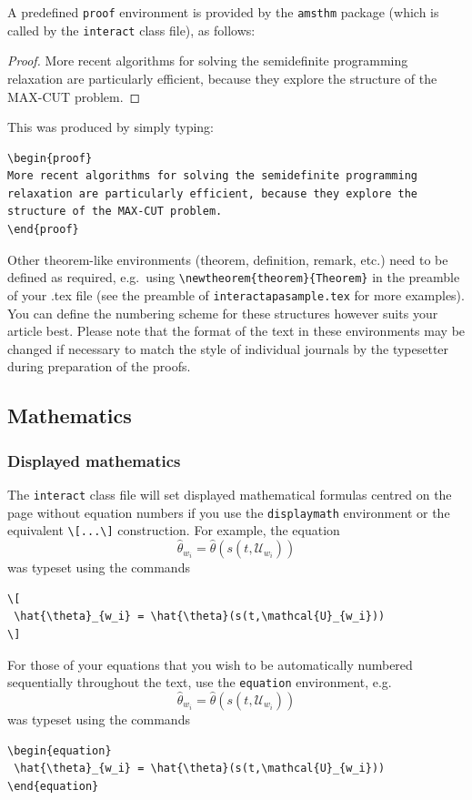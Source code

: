 \documentclass[]{interact}
\theoremstyle{plain}%
\theoremstyle{definition}
\theoremstyle{remark}
\begin{document}
A predefined \verb"proof" environment is provided by the \texttt{amsthm} package (which is called by the \texttt{interact} class file), as follows:
\begin{proof}
More recent algorithms for solving the semidefinite programming relaxation are particularly efficient, because they explore the structure of the MAX-CUT problem.
\end{proof}
\noindent This was produced by simply typing:
\begin{verbatim}
\begin{proof}
More recent algorithms for solving the semidefinite programming
relaxation are particularly efficient, because they explore the
structure of the MAX-CUT problem.
\end{proof}
\end{verbatim}
Other theorem-like environments (theorem, definition, remark, etc.) need to be defined as required, e.g.\ using \verb"\newtheorem{theorem}{Theorem}" in the preamble of your .tex file (see the preamble of \verb"interactapasample.tex" for more examples). You can define the numbering scheme for these structures however suits your article best. Please note that the format of the text in these environments may be changed if necessary to match the style of individual journals by the typesetter during preparation of the proofs.


\subsection{Mathematics}

\subsubsection{Displayed mathematics}

The \texttt{interact} class file will set displayed mathematical formulas centred on the page without equation numbers if you use the \texttt{displaymath} environment or the equivalent \verb"\[...\]" construction. For example, the equation
\[
 \hat{\theta}_{w_i} = \hat{\theta}(s(t,\mathcal{U}_{w_i}))
\]
was typeset using the commands
\begin{verbatim}
\[
 \hat{\theta}_{w_i} = \hat{\theta}(s(t,\mathcal{U}_{w_i}))
\]
\end{verbatim}

For those of your equations that you wish to be automatically numbered sequentially throughout the text, use the \texttt{equation} environment, e.g.
\begin{equation}
 \hat{\theta}_{w_i} = \hat{\theta}(s(t,\mathcal{U}_{w_i}))
\end{equation}
was typeset using the commands
\begin{verbatim}
\begin{equation}
 \hat{\theta}_{w_i} = \hat{\theta}(s(t,\mathcal{U}_{w_i}))
\end{equation}
\end{verbatim}
\end{document}

